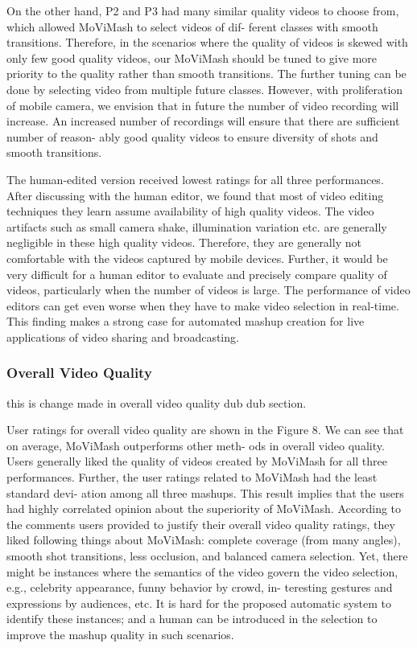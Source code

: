 \documentclass{new}
\begin{document}
On the other hand, P2 and P3 had many similar quality videos
to choose from, which allowed MoViMash to select videos of dif-
ferent classes with smooth transitions. Therefore, in the scenarios
where the quality of videos is skewed with only few good quality
videos, our MoViMash should be tuned to give more priority to
the quality rather than smooth transitions. The further tuning can
be done by selecting video from multiple future classes. However,
with proliferation of mobile camera, we envision that in future the
number of video recording will increase. An increased number of
recordings will ensure that there are sufficient number of reason-
ably good quality videos to ensure diversity of shots and smooth
transitions.

The human-edited version received lowest ratings for all three
performances. After discussing with the human editor, we found
that most of video editing techniques they learn assume availability
of high quality videos. The video artifacts such as small camera shake, illumination variation etc. are generally negligible in these
high quality videos. Therefore, they are generally not comfortable
with the videos captured by mobile devices. Further, it would be
very difficult for a human editor to evaluate and precisely compare
quality of videos, particularly when the number of videos is large.
The performance of video editors can get even worse when they
have to make video selection in real-time. This finding makes a
strong case for automated mashup creation for live applications of
video sharing and broadcasting.

\subsubsection{Overall Video Quality}
this is change made in overall video quality dub dub section.

User ratings for overall video quality are shown in the Figure 8.
We can see that on average, MoViMash outperforms other meth-
ods in overall video quality. Users generally liked the quality of
videos created by MoViMash for all three performances. Further,
the user ratings related to MoViMash had the least standard devi-
ation among all three mashups. This result implies that the users
had highly correlated opinion about the superiority of MoViMash.
According to the comments users provided to justify their overall
video quality ratings, they liked following things about MoViMash:
complete coverage (from many angles), smooth shot transitions,
less occlusion, and balanced camera selection. Yet, there might
be instances where the semantics of the video govern the video
selection, e.g., celebrity appearance, funny behavior by crowd, in-
teresting gestures and expressions by audiences, etc. It is hard for
the proposed automatic system to identify these instances; and a
human can be introduced in the selection to improve the mashup
quality in such scenarios.
\end{document}
